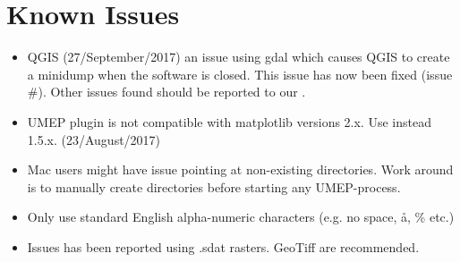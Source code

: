 \documentclass[letterpaper,10pt,english]{sphinxmanual}
\begin{document}
\chapter{Known Issues}
\label{\detokenize{Known_Issues:known-issues}}\label{\detokenize{Known_Issues:id1}}\label{\detokenize{Known_Issues::doc}}\begin{itemize}
\item {} 
QGIS (27/September/2017)  an issue using gdal which causes
QGIS to create a minidump when the software is closed. This issue has
now been fixed (issue
\#). Other issues found
should be reported to our
.

\item {} 
UMEP plugin is not compatible with matplotlib versions 2.x. Use
instead 1.5.x. (23/August/2017)

\item {} 
Mac users might have issue pointing at non-existing directories. Work
around is to manually create directories before starting any
UMEP-process.

\item {} 
Only use standard English alpha-numeric characters (e.g. no space, å,
\% etc.)

\item {} 
Issues has been reported using .sdat rasters. GeoTiff are
recommended.

\end{itemize}
\end{document}
